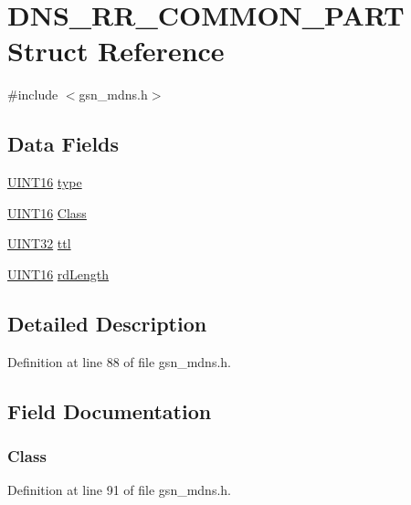 \hypertarget{a00015}{
\section{DNS\_\-RR\_\-COMMON\_\-PART Struct Reference}
\label{a00015}
}


{\ttfamily \#include $<$gsn\_\-mdns.h$>$}

\subsection*{Data Fields}
\begin{DoxyCompactItemize}
\item 
\hyperlink{a00660_ga09f1a1fb2293e33483cc8d44aefb1eb1}{UINT16} \hyperlink{a00015_a3e67ac96505a8b96372877b6fc386169}{type}
\item 
\hyperlink{a00660_ga09f1a1fb2293e33483cc8d44aefb1eb1}{UINT16} \hyperlink{a00015_a0797d5793d51b23344f9e41c714bf187}{Class}
\item 
\hyperlink{a00660_gae1e6edbbc26d6fbc71a90190d0266018}{UINT32} \hyperlink{a00015_af96204bb13dce2fe8a0dac78b29c40a4}{ttl}
\item 
\hyperlink{a00660_ga09f1a1fb2293e33483cc8d44aefb1eb1}{UINT16} \hyperlink{a00015_aceb8beab66fb702ac68fcbe4bbd16f9d}{rdLength}
\end{DoxyCompactItemize}


\subsection{Detailed Description}


Definition at line 88 of file gsn\_\-mdns.h.



\subsection{Field Documentation}
\hypertarget{a00015_a0797d5793d51b23344f9e41c714bf187}{
\subsubsection[{Class}]{ {\bf Class}}}
\label{a00015_a0797d5793d51b23344f9e41c714bf187}


Definition at line 91 of file gsn\_\-mdns.h.

